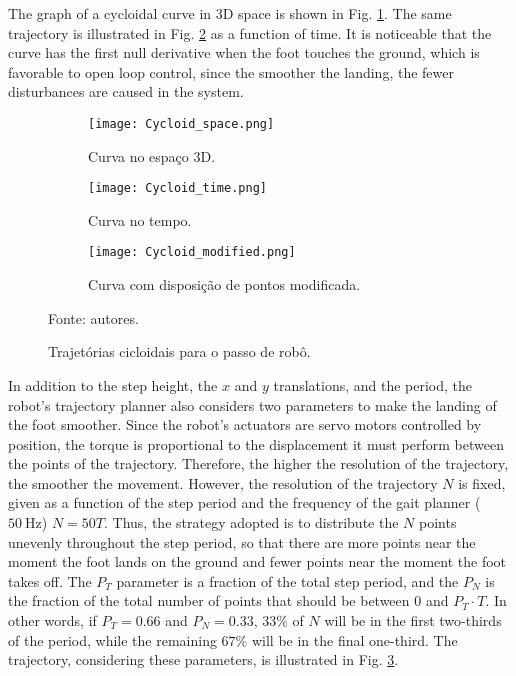 \documentclass[conference]{IEEEtran}
\begin{document}
The graph of a cycloidal curve in 3D space is shown in Fig. \ref{fig:traj_space}. The same trajectory is illustrated in Fig. \ref{fig:traj_time} as a function of time. It is noticeable that the curve has the first null derivative when the foot touches the ground, which is favorable to open loop control, since the smoother the landing, the fewer disturbances are caused in the system.

\begin{figure*}[h]
  \centering
  \begin{subfigure}[t]{0.32\textwidth}
    \centering
    \texttt{[image: Cycloid\_space.png]}
    \caption{Curva no espaço 3D.}
    \label{fig:traj_space}
  \end{subfigure}
  \begin{subfigure}[t]{0.32\textwidth}
    \centering
    \texttt{[image: Cycloid\_time.png]}
    \caption{Curva no tempo.}
    \label{fig:traj_time}
  \end{subfigure}
  \begin{subfigure}[t]{0.32\textwidth}
    \centering
    \texttt{[image: Cycloid\_modified.png]}
    \caption{Curva com disposição de pontos modificada.}
    \label{fig:traj_time_modified}
  \end{subfigure}
  \vfill
  \caption{Trajetórias cicloidais para o passo de robô.}
  Fonte: autores.
  \label{fig:traj_curve}
\end{figure*}

In addition to the step height, the $x$ and $y$ translations, and the period, the robot's trajectory planner also considers two parameters to make the landing of the foot smoother. Since the robot’s actuators are servo motors controlled by position, the torque is proportional to the displacement it must perform between the points of the trajectory. Therefore, the higher the resolution of the trajectory, the smoother the movement. However, the resolution of the trajectory $N$ is fixed, given as a function of the step period and the frequency of the gait planner ($\SI{50}{\hertz}$) $N = 50T$. Thus, the strategy adopted is to distribute the $N$ points unevenly throughout the step period, so that there are more points near the moment the foot lands on the ground and fewer points near the moment the foot takes off. The $P_T$ parameter is a fraction of the total step period, and the $P_N$ is the fraction of the total number of points that should be between $0$ and $P_T \cdot T$. In other words, if $P_T = 0.66$ and $P_N = 0.33$, $33\%$ of $N$ will be in the first two-thirds of the period, while the remaining $67\%$ will be in the final one-third. The trajectory, considering these parameters, is illustrated in Fig. \ref{fig:traj_time_modified}.
\end{document}
